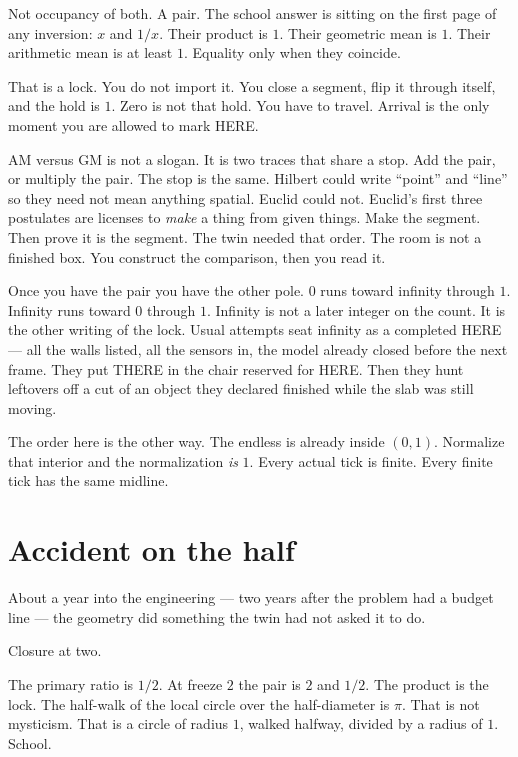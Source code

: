 \documentclass[11pt,a4paper]{article}
\begin{document}
Not occupancy of both.
A pair.
The school answer is sitting on the first page of any inversion: \(x\) and \(1/x\).
Their product is \(1\).
Their geometric mean is \(1\).
Their arithmetic mean is at least \(1\).
Equality only when they coincide.

That is a lock.
You do not import it.
You close a segment, flip it through itself, and the hold is \(1\).
Zero is not that hold.
You have to travel.
Arrival is the only moment you are allowed to mark HERE.

AM versus GM is not a slogan.
It is two traces that share a stop.
Add the pair, or multiply the pair.
The stop is the same.
Hilbert could write ``point'' and ``line'' so they need not mean anything spatial.
Euclid could not.
Euclid's first three postulates are licenses to \emph{make} a thing from given things.
Make the segment.
Then prove it is the segment.
The twin needed that order.
The room is not a finished box.
You construct the comparison, then you read it.

Once you have the pair you have the other pole.
\(0\) runs toward infinity through \(1\).
Infinity runs toward \(0\) through \(1\).
Infinity is not a later integer on the count.
It is the other writing of the lock.
Usual attempts seat infinity as a completed HERE --- all the walls listed, all the sensors in, the model already closed before the next frame.
They put THERE in the chair reserved for HERE.
Then they hunt leftovers off a cut of an object they declared finished while the slab was still moving.

The order here is the other way.
The endless is already inside \((0,1)\).
Normalize that interior and the normalization \emph{is} \(1\).
Every actual tick is finite.
Every finite tick has the same midline.

\section{Accident on the half}

About a year into the engineering --- two years after the problem had a budget line --- the geometry did something the twin had not asked it to do.

Closure at two.

The primary ratio is \(1/2\).
At freeze \(2\) the pair is \(2\) and \(1/2\).
The product is the lock.
The half-walk of the local circle over the half-diameter is \(\pi\).
That is not mysticism.
That is a circle of radius \(1\), walked halfway, divided by a radius of \(1\).
School.
\end{document}
